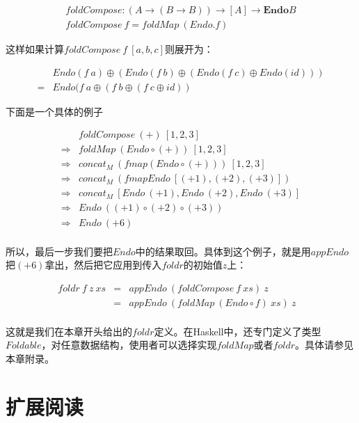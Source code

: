 \documentclass{article}
\begin{document}
\[
\begin{array}{l}
foldCompose : (A \to (B \to B)) \to [A] \to \mathbf{Endo}B \\
foldCompose\ f = foldMap\ (Endo . f)
\end{array}
\]

这样如果计算$foldCompose\ f\ [a, b, c]$则展开为：

\[
\begin{array}{cl}
  & Endo(f\ a) \oplus (Endo(f\ b) \oplus (Endo(f\ c) \oplus Endo(id))) \\
= & Endo(f\ a \oplus (f\ b \oplus (f\ c \oplus id))
\end{array}
\]

下面是一个具体的例子

\[
\begin{array}{cl}
            & foldCompose\ (+)\ [1, 2, 3] \\
\Rightarrow & foldMap\ (Endo \circ (+))\ [1, 2, 3] \\
\Rightarrow & concat_M\ (fmap (Endo \circ (+)))\ [1, 2, 3] \\
\Rightarrow & concat_M\ (fmap Endo\ [(+1), (+2), (+3)]) \\
\Rightarrow & concat_M\ [Endo\ (+1), Endo\ (+2), Endo\ (+3)] \\
\Rightarrow & Endo\ ((+1) \circ (+2) \circ (+3)) \\
\Rightarrow & Endo\ (+6) \\
\end{array}
\]

所以，最后一步我们要把$Endo$中的结果取回。具体到这个例子，就是用$appEndo$把$(+6)$拿出，然后把它应用到传入$foldr$的初始值$z$上：

\[
\begin{array}{rcll}
foldr\ f\ z\ xs
  & = & appEndo\ (foldCompose\ f\ xs)\ z & \\
  & = & appEndo\ (foldMap\ (Endo \circ f)\ xs)\ z \\
\end{array}
\]

这就是我们在本章开头给出的$foldr$定义。在Haskell中，还专门定义了类型$Foldable$，对任意数据结构，使用者可以选择实现$foldMap$或者$foldr$。具体请参见本章附录。

\section{扩展阅读}
\end{document}
